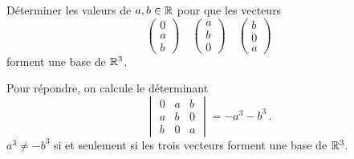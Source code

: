 \documentclass{book}
\begin{document}
\begin{Exemple}
Déterminer les valeurs de $a,b \in \mathbb{R}$ pour que les vecteurs
$$
\begin{pmatrix}0\\a\\b\end{pmatrix} \quad
\begin{pmatrix}a\\b\\0\end{pmatrix} \quad
\begin{pmatrix}b\\0\\a\end{pmatrix}$$
forment une base de $\mathbb{R}^3$.
\begin{Demonstration}
Pour répondre, on calcule le déterminant
\[
\begin{vmatrix}
  0 & a & b\\a & b & 0\\b & 0 & a
  \end{vmatrix}
= - a^3 - b^3 \,.
\]
$a^3 \neq - b^3$ si et seulement si les trois vecteurs forment une base de $\mathbb{R}^3$.
\end{Demonstration}
\end{Exemple}
\end{document}
